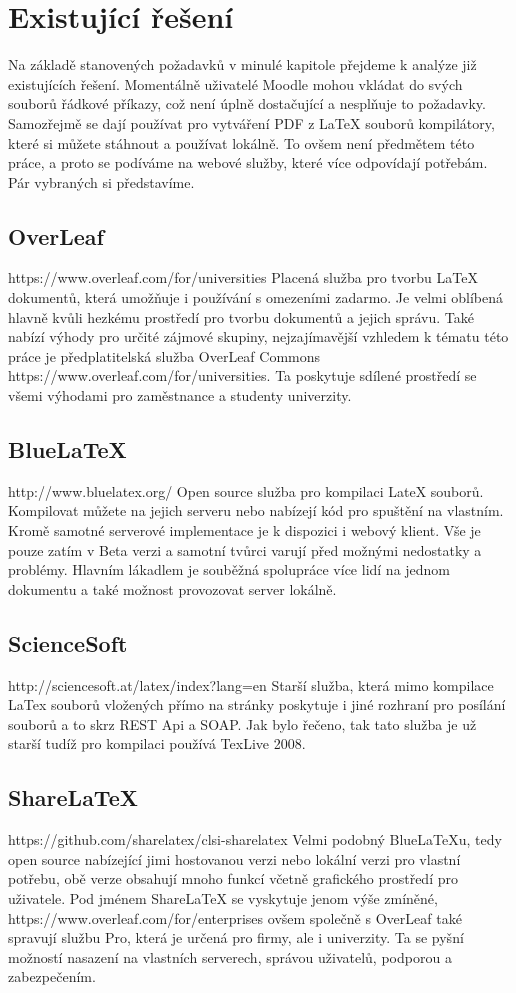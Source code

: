 \section{Existující řešení}
Na základě stanovených požadavků v minulé kapitole přejdeme k analýze již existujících řešení. Momentálně uživatelé Moodle mohou vkládat do svých souborů řádkové příkazy, což není úplně dostačující a nesplňuje to požadavky. Samozřejmě se dají používat pro vytváření PDF z LaTeX souborů kompilátory, které si můžete stáhnout a používat lokálně. To ovšem není předmětem této práce, a proto se podíváme na webové služby, které více odpovídají potřebám. Pár vybraných si představíme.  

\subsection{OverLeaf}
https://www.overleaf.com/for/universities
Placená služba pro tvorbu LaTeX dokumentů, která umožňuje i používání s omezeními zadarmo. Je velmi oblíbená hlavně kvůli hezkému prostředí pro tvorbu dokumentů a jejich správu. Také nabízí výhody pro určité zájmové skupiny, nejzajímavější vzhledem k tématu této práce je předplatitelská služba OverLeaf Commons https://www.overleaf.com/for/universities. Ta poskytuje sdílené prostředí se všemi výhodami pro zaměstnance a studenty univerzity.

\subsection{BlueLaTeX}
http://www.bluelatex.org/
Open source služba pro kompilaci LateX souborů. Kompilovat můžete na jejich serveru nebo nabízejí kód pro spuštění na vlastním. Kromě samotné serverové implementace je k dispozici i webový klient. Vše je pouze zatím v Beta verzi a samotní tvůrci varují před možnými nedostatky a problémy. Hlavním lákadlem je souběžná spolupráce více lidí na jednom dokumentu a také možnost provozovat server lokálně. 

\subsection{ScienceSoft}
http://sciencesoft.at/latex/index?lang=en
Starší služba, která mimo kompilace LaTex souborů vložených přímo na stránky poskytuje i jiné rozhraní pro posílání souborů a to skrz REST Api a SOAP. Jak bylo řečeno, tak tato služba je už starší tudíž pro kompilaci používá TexLive 2008.

\subsection{ShareLaTeX}
https://github.com/sharelatex/clsi-sharelatex
Velmi podobný BlueLaTeXu, tedy open source nabízející jimi hostovanou verzi nebo lokální verzi pro vlastní potřebu, obě verze obsahují mnoho funkcí včetně grafického prostředí pro uživatele. Pod jménem ShareLaTeX se vyskytuje jenom výše zmíněné, https://www.overleaf.com/for/enterprises ovšem společně s OverLeaf také spravují službu Pro, která je určená pro firmy, ale i univerzity. Ta se pyšní možností nasazení na vlastních serverech, správou uživatelů, podporou a zabezpečením.

